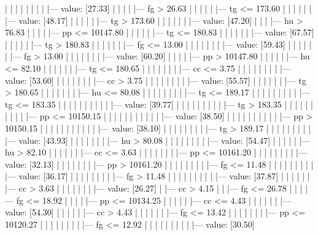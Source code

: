\documentclass[UTF8, a4paper]{ctexart}
\begin{document}
|   |   |   |   |   |   |   |   |--- value: [27.33]
|   |   |   |   |--- fg >  26.63
|   |   |   |   |   |--- tg <= 173.60
|   |   |   |   |   |   |--- value: [48.17]
|   |   |   |   |   |--- tg >  173.60
|   |   |   |   |   |   |--- value: [47.20]
|   |   |   |--- hu >  76.83
|   |   |   |   |--- pp <= 10147.80
|   |   |   |   |   |--- tg <= 180.83
|   |   |   |   |   |   |--- value: [67.57]
|   |   |   |   |   |--- tg >  180.83
|   |   |   |   |   |   |--- fg <= 13.00
|   |   |   |   |   |   |   |--- value: [59.43]
|   |   |   |   |   |   |--- fg >  13.00
|   |   |   |   |   |   |   |--- value: [60.20]
|   |   |   |   |--- pp >  10147.80
|   |   |   |   |   |--- hu <= 82.10
|   |   |   |   |   |   |--- tg <= 180.65
|   |   |   |   |   |   |   |--- cc <= 3.75
|   |   |   |   |   |   |   |   |--- value: [53.60]
|   |   |   |   |   |   |   |--- cc >  3.75
|   |   |   |   |   |   |   |   |--- value: [55.57]
|   |   |   |   |   |   |--- tg >  180.65
|   |   |   |   |   |   |   |--- hu <= 80.08
|   |   |   |   |   |   |   |   |--- tg <= 189.17
|   |   |   |   |   |   |   |   |   |--- tg <= 183.35
|   |   |   |   |   |   |   |   |   |   |--- value: [39.77]
|   |   |   |   |   |   |   |   |   |--- tg >  183.35
|   |   |   |   |   |   |   |   |   |   |--- pp <= 10150.15
|   |   |   |   |   |   |   |   |   |   |   |--- value: [38.50]
|   |   |   |   |   |   |   |   |   |   |--- pp >  10150.15
|   |   |   |   |   |   |   |   |   |   |   |--- value: [38.10]
|   |   |   |   |   |   |   |   |--- tg >  189.17
|   |   |   |   |   |   |   |   |   |--- value: [43.93]
|   |   |   |   |   |   |   |--- hu >  80.08
|   |   |   |   |   |   |   |   |--- value: [54.47]
|   |   |   |   |   |--- hu >  82.10
|   |   |   |   |   |   |--- cc <= 3.63
|   |   |   |   |   |   |   |--- pp <= 10161.20
|   |   |   |   |   |   |   |   |--- value: [32.13]
|   |   |   |   |   |   |   |--- pp >  10161.20
|   |   |   |   |   |   |   |   |--- fg <= 11.48
|   |   |   |   |   |   |   |   |   |--- value: [36.17]
|   |   |   |   |   |   |   |   |--- fg >  11.48
|   |   |   |   |   |   |   |   |   |--- value: [37.87]
|   |   |   |   |   |   |--- cc >  3.63
|   |   |   |   |   |   |   |--- value: [26.27]
|   |--- cc >  4.15
|   |   |--- fg <= 26.78
|   |   |   |--- fg <= 18.92
|   |   |   |   |--- pp <= 10134.25
|   |   |   |   |   |--- cc <= 4.43
|   |   |   |   |   |   |--- value: [54.30]
|   |   |   |   |   |--- cc >  4.43
|   |   |   |   |   |   |--- fg <= 13.42
|   |   |   |   |   |   |   |--- pp <= 10120.27
|   |   |   |   |   |   |   |   |--- fg <= 12.92
|   |   |   |   |   |   |   |   |   |--- value: [30.50]
\end{document}
